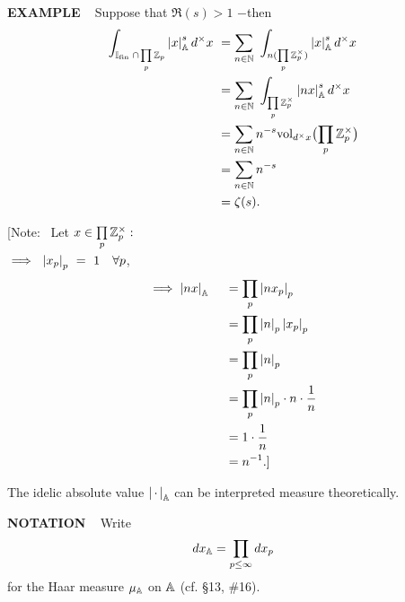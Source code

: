 \begin{x}{\small\bf EXAMPLE} \ %
Suppose that $\Re (s) > 1$ $-$then
\allowdisplaybreaks
\begin{align*}
\int_{\I_{\fin} \hspace{0.03cm}\cap \hspace{0.03cm} \prod\limits_p \Z_p} \abs{x}_\A^s d^\times x 	\ 
&= \sum_{n \in \N} \ \int_{n(\prod\limits_p \Z_p^\times)} \abs{x}_\A^s d^\times x \\	
&= \sum_{n \in \N} \ \int_{\prod\limits_p \Z_p^\times} \abs{nx}_\A^s d^\times x \\
&= \sum_{n \in \N} n^{-s} \vol_{d^\times x} \bigl(\prod\limits_p \Z_p^\times\bigr) \\
&= \sum_{n \in \N} n^{-s} \\
&= \zeta(s). 
\end{align*}

\vspace{0.1cm}

[Note: \  Let $x \in \prod\limits_p \mathbb{Z}_p^\times:$\\

\qquad\qquad $\implies  \  \abs{x_p}_p \ = \ 1 	\quad  \forall p$, 
\begin{align*}
\implies \left\vert nx\right\vert_{\mathbb{A}} \quad \ 	
&= \prod\limits_p \left\vert nx_p\right\vert_p \\	
&= \prod\limits_p \left\vert n\right\vert_p \left\vert x_p\right\vert_p \\	
&= \prod\limits_p \left\vert n\right\vert_p \\
&= \prod\limits_p \left\vert n\right\vert_p \cdot n \cdot \frac{1}{n} \\
&= 1\cdot \frac{1}{n}\\
&= n^{-1}.]
\end{align*}
\end{x}

\vspace{0.1cm}


The idelic absolute value $\left\vert\hspace{0.05cm} \cdot \hspace{0.05cm}\right\vert_{\mathbb{A}}$ can be interpreted measure theoretically.
\vspace{0.1cm}

\begin{x}{\small\bf NOTATION} \ %
Write
\[
dx_{\mathbb{A}} = \prod_{p \le \infty} dx_p
\]
for the Haar measure $\mu_{\mathbb{A}}$ on $\mathbb{A}$ (cf. \S13, \#16).
\end{x}

\vspace{0.1cm}


